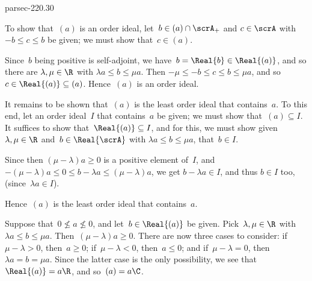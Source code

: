 \documentclass[b5page]{book}
\begin{document}
\begin{solution}{parsec-220.30}
\begin{enumerate}
To show that~$(a)$ is an order ideal,
let~$b\in (a)\cap \scrA_+$ 
and $c\in\scrA$ with $-b\leq c\leq b$ be given;
we must show that~$c\in(a)$.

Since~$b$ being positive is self-adjoint,
we have~$b=\Real{b}\in \Real{(a)}$,
and so there are $\lambda,\mu\in \R$
with $\lambda a\leq b\leq \mu a$.
Then $-\mu \leq-b \leq c \leq b  \leq \mu a$,
and so~$c\in \Real{(a)}\subseteq (a)$.
Hence~$(a)$ is an order ideal.

It remains to be shown that~$(a)$ is the least order ideal
that contains~$a$. 
To this end, let an order ideal~$I$ that contains~$a$ be given;
we must show that~$(a)\subseteq I$.
It suffices to show that~$\Real{(a)}\subseteq I$,
and for this,
we must show given~$\lambda,\mu\in \R$
and~$b\in \Real{\scrA}$ with $\lambda a \leq b \leq \mu a$,
that~$b\in I$.

Since then $(\mu-\lambda)a \geq 0$
is a positive element of~$I$,
and $-(\mu-\lambda)a\leq 0 \leq b-\lambda a \leq (\mu-\lambda)a$,
we get $b-\lambda a \in I$,
and thus $b\in I$ too, (since~$\lambda a\in I$).

Hence~$(a)$ is the least order ideal that contains~$a$.

Suppose that~$0\nleq a\nleq 0$,
and let~$b\in \Real{(a)}$ be given.
Pick~$\lambda,\mu \in \R$ with $\lambda a \leq b \leq \mu a$.
Then~$(\mu-\lambda)a\geq 0$.
There are now three cases to consider:
if~$\mu-\lambda >0$, then~$a\geq 0$;
if~$\mu-\lambda < 0$, then~$a\leq 0$;
and if~$\mu-\lambda = 0$, then~$\lambda a = b = \mu a$.
Since the latter case is the only possibility,
we see that~$\Real{(a)}=a\R$, and so~$(a)=a\C$.


\end{enumerate}
\end{solution}
\end{document}
